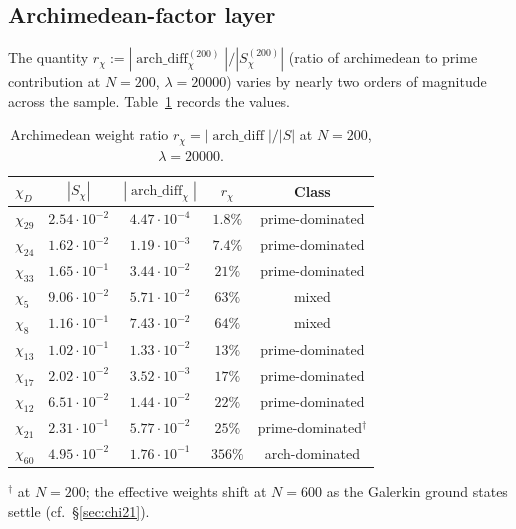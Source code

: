 \documentclass[a4paper,10pt,twocolumn]{article}
\theoremstyle{definition}
\theoremstyle{remark}
\newcommand{\chifn}{\chi}
\newcommand{\archdiff}{\operatorname{arch\_diff}}
\begin{document}
\subsection{Archimedean-factor layer}
\label{sec:archlayer}

The quantity
$r_{\chifn}:=|\archdiff_{\chifn}^{(200)}|/|S_{\chifn}^{(200)}|$
(ratio of archimedean to prime contribution at $N=200$,
$\lambda=20000$) varies by nearly two orders of magnitude across the
sample. Table~\ref{tab:archratio} records the values.

\begin{table}[t]
\caption{Archimedean weight ratio
  $r_{\chifn}=|\archdiff|/|S|$ at $N=200$, $\lambda=20000$.}
\label{tab:archratio}
\centering\scriptsize
\begin{tabular}{@{}lcccc@{}}
\toprule
$\chifn_D$ & $|S_{\chifn}|$ & $|\archdiff_{\chifn}|$ & $r_{\chifn}$ & Class \\
\midrule
$\chifn_{29}$ & $2.54\!\cdot\!10^{-2}$ & $4.47\!\cdot\!10^{-4}$ & $1.8\%$ & prime-dominated \\
$\chifn_{24}$ & $1.62\!\cdot\!10^{-2}$ & $1.19\!\cdot\!10^{-3}$ & $7.4\%$ & prime-dominated \\
$\chifn_{33}$ & $1.65\!\cdot\!10^{-1}$ & $3.44\!\cdot\!10^{-2}$ & $21\%$ & prime-dominated \\
$\chifn_5$ & $9.06\!\cdot\!10^{-2}$ & $5.71\!\cdot\!10^{-2}$ & $63\%$ & mixed \\
$\chifn_8$ & $1.16\!\cdot\!10^{-1}$ & $7.43\!\cdot\!10^{-2}$ & $64\%$ & mixed \\
$\chifn_{13}$ & $1.02\!\cdot\!10^{-1}$ & $1.33\!\cdot\!10^{-2}$ & $13\%$ & prime-dominated \\
$\chifn_{17}$ & $2.02\!\cdot\!10^{-2}$ & $3.52\!\cdot\!10^{-3}$ & $17\%$ & prime-dominated \\
$\chifn_{12}$ & $6.51\!\cdot\!10^{-2}$ & $1.44\!\cdot\!10^{-2}$ & $22\%$ & prime-dominated \\
$\chifn_{21}$ & $2.31\!\cdot\!10^{-1}$ & $5.77\!\cdot\!10^{-2}$ & $25\%$ & prime-dominated$^\dagger$ \\
$\chifn_{60}$ & $4.95\!\cdot\!10^{-2}$ & $1.76\!\cdot\!10^{-1}$ & $356\%$ & arch-dominated \\
\bottomrule
\end{tabular}

\smallskip
\footnotesize
$^\dagger$ at $N=200$; the effective weights shift at $N=600$ as
the Galerkin ground states settle (cf.\ \S\ref{sec:chi21}).
\end{table}
\end{document}
